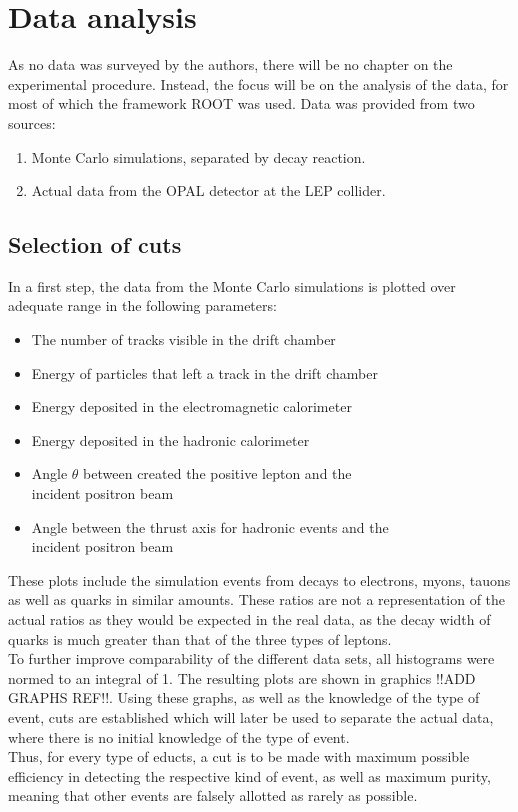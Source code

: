 \section{Data analysis}
As no data was surveyed by the authors, there will be no chapter on the experimental procedure. Instead, the focus will be on the analysis of the data, for most of which the framework ROOT was used. Data was provided from two sources:
\begin{enumerate}
	\item Monte Carlo simulations, separated by decay reaction.
	\item Actual data from the OPAL detector at the LEP collider.
\end{enumerate}


\subsection{Selection of cuts}
In a first step, the data from the Monte Carlo simulations is plotted over adequate range in the following parameters:
\begin{itemize}
	\item{The number of tracks visible in the drift chamber}
	\item{Energy of particles that left a track in the drift chamber}
	\item{Energy deposited in the electromagnetic calorimeter}
	\item{Energy deposited in the hadronic calorimeter}
	\item{Angle $\theta$ between created the positive lepton and the \\\makebox[3cm][l]{}incident positron beam}
	\item{Angle between the thrust axis for hadronic events and the \\\makebox[3cm][l]{}incident positron beam}
\end{itemize}
These plots include the simulation events from decays to electrons, myons, tauons as well as quarks in similar amounts. These ratios are not a representation of the actual ratios as they would be expected in the real data, as the decay width of quarks is much greater than that of the three types of leptons. \\
To further improve comparability of the different data sets, all histograms were normed to an integral of 1. The resulting plots are shown in graphics !!ADD GRAPHS REF!!. Using these graphs, as well as the knowledge of the type of event, cuts are established which will later be used to separate the actual data, where there is no initial knowledge of the type of event.\\
Thus, for every type of educts, a cut is to be made with maximum possible efficiency in detecting the respective kind of event, as well as maximum purity, meaning that other events are falsely allotted as rarely as possible.

